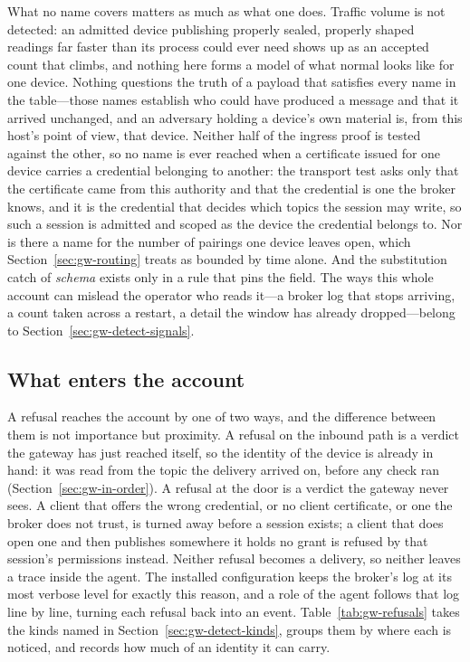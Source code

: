 \documentclass[12pt,a4paper]{report}
\begin{document}
What no name covers matters as much as what one does. Traffic volume is
not detected: an admitted device publishing properly sealed, properly
shaped readings far faster than its process could ever need shows up as an
accepted count that climbs, and nothing here forms a model of what normal
looks like for one device. Nothing questions the truth of a payload that
satisfies every name in the table---those names establish who could have
produced a message and that it arrived unchanged, and an adversary holding
a device's own material is, from this host's point of view, that device.
Neither half of the ingress proof is tested against the other, so no name
is ever reached when a certificate issued for one device carries a
credential belonging to another: the transport test asks only that the
certificate came from this authority and that the credential is one the
broker knows, and it is the credential that decides which topics the
session may write, so such a session is admitted and scoped as the device
the credential belongs to. Nor is there a name for the number of pairings
one device leaves open, which Section~\ref{sec:gw-routing} treats as bounded
by time alone. And the substitution catch of \emph{schema} exists only in a
rule that pins the field. The ways this whole account can mislead
the operator who reads it---a broker log that stops arriving, a count taken
across a restart, a detail the window has already dropped---belong to
Section~\ref{sec:gw-detect-signals}.

\subsection{What enters the account}
\label{sec:gw-detect-events}

A refusal reaches the account by one of two ways, and the difference
between them is not importance but proximity. A refusal on the inbound
path is a verdict the gateway has just reached itself, so the identity
of the device is already in hand: it was read from the topic the
delivery arrived on, before any check ran
(Section~\ref{sec:gw-in-order}). A refusal at the door is a verdict the
gateway never sees. A client that offers the wrong credential, or no
client certificate, or one the broker does not trust, is turned away
before a session exists; a client that does open one and then publishes
somewhere it holds no grant is refused by that session's permissions
instead. Neither refusal becomes a delivery, so neither leaves a trace
inside the agent. The installed configuration
keeps the broker's log at its most verbose level for exactly this
reason, and a role of the agent follows that log line by line, turning
each refusal back into an event. Table~\ref{tab:gw-refusals} takes the
kinds named in Section~\ref{sec:gw-detect-kinds}, groups them by where
each is noticed, and records how much of an identity it can carry.
\end{document}
